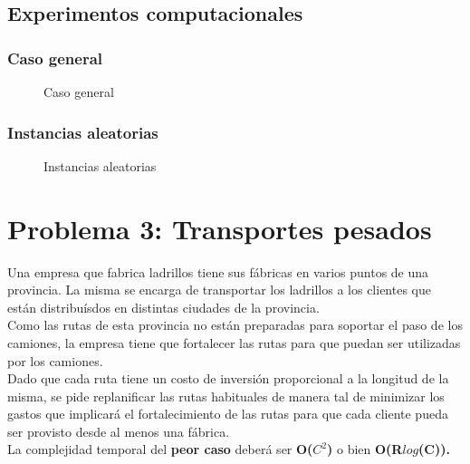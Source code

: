 \documentclass[a4paper, 10pt, twoside]{article}
\newcommand{\dosgraficos}[2]{
    \newcommand{\separacion}{-2.2em}
    \vspace{\separacion}
    
    \vspace{\separacion}
    
}
\begin{document}
\subsection{Experimentos computacionales}


\subsubsection{Caso general}

\begin{figure}[H]
  \centering
  \dosgraficos{problema2-caso-general}
              {problema2-caso-general-n}
  \caption{Caso general}
\end{figure}


\subsubsection{Instancias aleatorias}

\begin{figure}[H]
  \centering
  \dosgraficos{problema2-instancias-aleatorias}
              {problema2-instancias-aleatorias-n}
  \caption{Instancias aleatorias}
\end{figure}





\newpage

\section{Problema 3: Transportes pesados}

Una empresa que fabrica ladrillos tiene sus fábricas en varios puntos de una provincia. La misma se encarga de transportar los ladrillos a los clientes que están distribuísdos en distintas ciudades de la provincia.\\
Como las rutas de esta provincia no están preparadas para soportar el paso de los camiones, la empresa tiene que fortalecer las rutas para que puedan ser utilizadas por los camiones.\\
Dado que cada ruta tiene un costo de inversión proporcional a la longitud de la misma, se pide replanificar las rutas habituales de manera tal de minimizar los gastos que implicará el fortalecimiento de las rutas para que cada cliente pueda ser provisto desde al menos una fábrica.\\
La complejidad temporal del \textbf{peor caso} deberá ser \textbf{O($C^2$)} o bien \textbf{O(R$log$(C)).}
\end{document}
